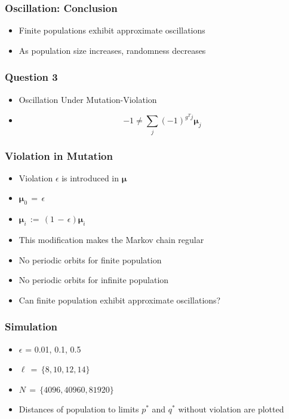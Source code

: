 \documentclass[aspectratio=169]{beamer}
\begin{document}
  \begin{frame}
    \frametitle{Oscillation: Conclusion}
    \begin{itemize}
      \item{Finite populations exhibit approximate oscillations}    
      \item{As population size increases, randomness decreases}      
    \end{itemize}
  \end{frame}
  
  \begin{frame}
    \frametitle{Question 3}
    \begin{itemize}
      \item{Oscillation Under Mutation-Violation}
      \item{
	\[
	  -1 \neq \sum \limits_{j} (-1)^{g^T j} \bm{\mu}_j      
	\]
      }
    \end{itemize}
  \end{frame}
  
  \begin{frame}
    \frametitle{Violation in Mutation}
    \begin{itemize}
      \item{Violation $\epsilon$ is introduced in $\bm{\mu}$}      
      \item{$\bm{\mu}_0 \,=\, \epsilon$}
      \item{$\bm{\mu}_i \,:=\, (1 \,-\, \epsilon)\bm{\mu}_i$}
      \item{This modification makes the Markov chain regular}
      \item{No periodic orbits for finite population}
      \item{No periodic orbits for infinite population}
      \item{Can finite population exhibit approximate oscillations?}
    \end{itemize}
  \end{frame}
  
  
  \begin{frame}
    \frametitle{Simulation}
    \begin{itemize}
      \item{$\epsilon$ = {0.01, 0.1, 0.5}}      
      \item{$\ell \,=\, \{8, 10, 12, 14\}$}
      \item{$N \,=\, \{4096, 40960, 81920\}$}
      \item{Distances of population to limits $p^\ast$ and  $q^\ast$ without violation are plotted }
    \end{itemize}
  \end{frame}
  
\end{document}
